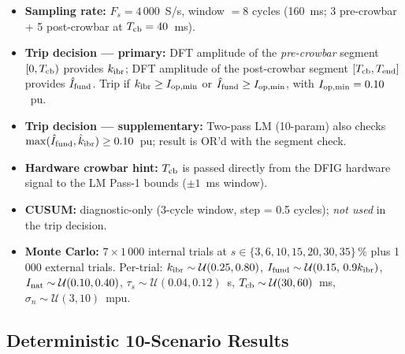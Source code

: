 \documentclass[11pt,a4paper]{article}
\begin{document}
\begin{itemize}
  \item \textbf{Sampling rate:} $F_s = 4\,000$~S/s, window $= 8$ cycles
        (160~ms; 3 pre-crowbar + 5 post-crowbar at $T_{\rm cb}=40$~ms).
  \item \textbf{Trip decision — primary:} DFT amplitude of the
        \emph{pre-crowbar} segment $[0, T_{\rm cb})$ provides $k_{\rm ibr}$;
        DFT amplitude of the post-crowbar segment $[T_{\rm cb}, T_{\rm end}]$
        provides $\hat{I}_{\rm fund}$.  Trip if
        $k_{\rm ibr} \geq I_{\rm op,min}$ or
        $\hat{I}_{\rm fund} \geq I_{\rm op,min}$, with $I_{\rm op,min}=0.10$~pu.
  \item \textbf{Trip decision — supplementary:}
        Two-pass LM (10-param) also checks $\max(\hat{I}_{\rm fund},\hat{k}_{\rm ibr})
        \geq 0.10$~pu; result is OR'd with the segment check.
  \item \textbf{Hardware crowbar hint:} $T_{\rm cb}$ is passed directly from
        the DFIG hardware signal to the LM Pass-1 bounds ($\pm 1$~ms window).
  \item \textbf{CUSUM:} diagnostic-only (3-cycle window, step = 0.5 cycles);
        \emph{not used} in the trip decision.
  \item \textbf{Monte Carlo:} $7 \times 1\,000$ internal trials at
        $s \in \{3,6,10,15,20,30,35\}\,\%$ plus 1\,000 external trials.
        Per-trial: $k_{\rm ibr} \sim \mathcal{U}(0.25,0.80)$,
        $I_{\rm fund} \sim \mathcal{U}(0.15,\,0.9k_{\rm ibr})$,
        $I_{\rm nat} \sim \mathcal{U}(0.10,0.40)$,
        $\tau_s \sim \mathcal{U}(0.04,0.12)$~s,
        $T_{\rm cb} \sim \mathcal{U}(30,60)$~ms,
        $\sigma_n \sim \mathcal{U}(3,10)$~mpu.
\end{itemize}

\subsection{Deterministic 10-Scenario Results}
\label{sec:det56}
\end{document}
